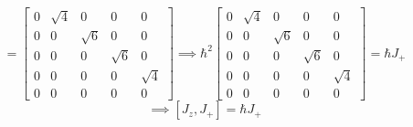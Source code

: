 \documentclass[letter, 10pts]{article}
\newcommand{\hb}{\hbar}
\begin{document}
\[
= \begin{bmatrix}
0 &  \sqrt{4} & 0 & 0 & 0 \\
0 & 0 & \sqrt{6} & 0 & 0 \\
0 & 0 & 0 & \sqrt{6} & 0 \\
0 & 0 & 0 & 0 & \sqrt{4} \\
0 & 0 & 0 & 0 & 0
\end{bmatrix} 
\implies \hb ^2 \begin{bmatrix}
0 &  \sqrt{4} & 0 & 0 & 0 \\
0 & 0 & \sqrt{6} & 0 & 0 \\
0 & 0 & 0 & \sqrt{6} & 0 \\
0 & 0 & 0 & 0 & \sqrt{4} \\
0 & 0 & 0 & 0 & 0
\end{bmatrix}  = \hb J_+
\] 
\[
\implies 
[J_z , J_+] = \hb J_+
\] 
\end{document}
